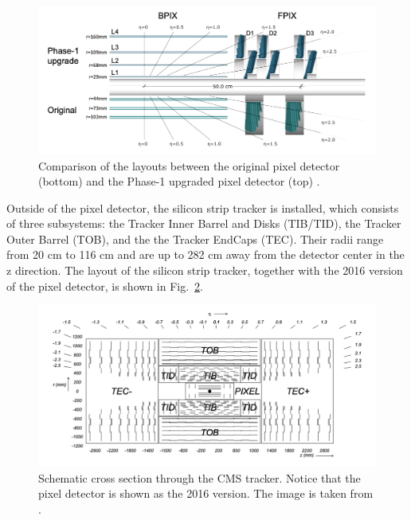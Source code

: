 \begin{figure}
    \begin{minipage}[t]{\linewidth}\centering
        \includegraphics[width=15cm]{inner_tracker_layout.png}
    \end{minipage}
    \caption{Comparison of the layouts between the original pixel detector (bottom) and the Phase-1 upgraded pixel detector (top) \cite{cms:tracker_upgrade}.}
    \label{fig:cms_tracker_upgrade}
\end{figure}

Outside of the pixel detector, the silicon strip tracker is installed, which consists of three subsystems:  the Tracker Inner Barrel and Disks (TIB/TID), 
the Tracker Outer Barrel (TOB), and the the Tracker EndCaps (TEC). Their radii range from 20 cm to 116 cm and are up to 282 cm away from the detector center 
in the z direction. The layout of the silicon strip tracker, together with the 2016 version of the pixel detector, is shown in Fig.~\ref{fig:cms_full_tracker_layout}.

\begin{figure}
    \begin{minipage}[t]{\linewidth}\centering
        \includegraphics[width=15cm]{full_tracker_layout.png}
    \end{minipage}
    \caption{Schematic cross section through the CMS tracker. Notice that the pixel detector is shown as the 2016 version.
    The image is taken from \cite{cms:cms_experiment}.}
    \label{fig:cms_full_tracker_layout}
\end{figure}

